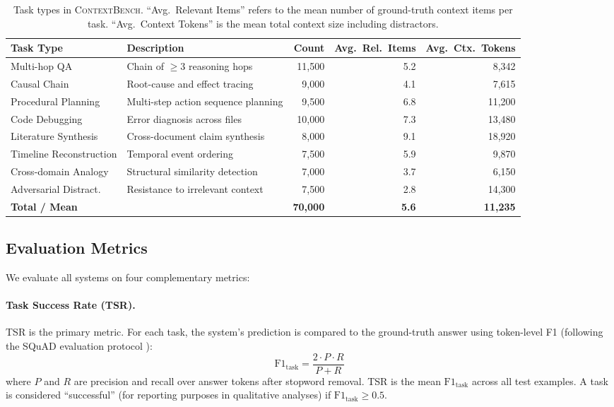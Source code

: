 \documentclass[review,12pt]{elsarticle}
\newcommand{\contextbench}{\textsc{ContextBench}}
\begin{document}
\begin{table}[t]
\centering
\caption{Task types in \contextbench{}.  ``Avg.\ Relevant Items'' refers to
  the mean number of ground-truth context items per task.
  ``Avg.\ Context Tokens'' is the mean total context size including distractors.}
\label{tab:task-types}
\begin{tabular}{llrrr}
\toprule
\textbf{Task Type} & \textbf{Description} & \textbf{Count} &
\textbf{Avg.\ Rel.\ Items} & \textbf{Avg.\ Ctx.\ Tokens} \\
\midrule
Multi-hop QA         & Chain of $\geq 3$ reasoning hops   & 11{,}500 & 5.2 & 8{,}342 \\
Causal Chain         & Root-cause and effect tracing       & 9{,}000  & 4.1 & 7{,}615 \\
Procedural Planning  & Multi-step action sequence planning & 9{,}500  & 6.8 & 11{,}200 \\
Code Debugging       & Error diagnosis across files        & 10{,}000 & 7.3 & 13{,}480 \\
Literature Synthesis & Cross-document claim synthesis      & 8{,}000  & 9.1 & 18{,}920 \\
Timeline Reconstruction & Temporal event ordering          & 7{,}500  & 5.9 & 9{,}870 \\
Cross-domain Analogy & Structural similarity detection     & 7{,}000  & 3.7 & 6{,}150 \\
Adversarial Distract.& Resistance to irrelevant context    & 7{,}500  & 2.8 & 14{,}300 \\
\midrule
\textbf{Total / Mean} & & \textbf{70{,}000} & \textbf{5.6} & \textbf{11{,}235} \\
\bottomrule
\end{tabular}
\end{table}

\subsection{Evaluation Metrics}
\label{subsec:metrics}

We evaluate all systems on four complementary metrics:

\paragraph{Task Success Rate (TSR).}
TSR is the primary metric.  For each task, the system's prediction is compared
to the ground-truth answer using token-level F1 (following the SQuAD evaluation
protocol \citep{rajpurkar2016squad}):
\begin{equation}
  \text{F1}_{\text{task}} = \frac{2 \cdot P \cdot R}{P + R}
  \label{eq:f1}
\end{equation}
where $P$ and $R$ are precision and recall over answer tokens after stopword
removal.  TSR is the mean $\text{F1}_{\text{task}}$ across all test examples.
A task is considered ``successful'' (for reporting purposes in qualitative
analyses) if $\text{F1}_{\text{task}} \geq 0.5$.
\end{document}
